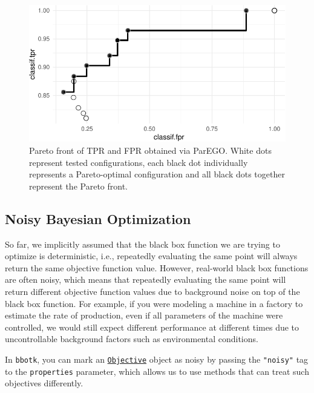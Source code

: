 \begin{figure}

{\centering \includegraphics[width=1\textwidth,height=\textheight]{chapters/chapter5/advanced_tuning_methods_and_black_box_optimization_files/figure-pdf/fig-pareto-bayesopt-1.pdf}

}

\caption{\label{fig-pareto-bayesopt}Pareto front of TPR and FPR obtained
via ParEGO. White dots represent tested configurations, each black dot
individually represents a Pareto-optimal configuration and all black
dots together represent the Pareto front.}

\end{figure}

\hypertarget{sec-noisy-bayesian-optimization}{%
\subsection{Noisy Bayesian
Optimization}\label{sec-noisy-bayesian-optimization}}

So far, we implicitly assumed that the black box function we are trying
to optimize is deterministic, i.e., repeatedly evaluating the same point
will always return the same objective function value. However,
real-world black box functions are often noisy, which means that
repeatedly evaluating the same point will return different objective
function values due to background noise on top of the black box
function. For example, if you were modeling a machine in a factory to
estimate the rate of production, even if all parameters of the machine
were controlled, we would still expect different performance at
different times due to uncontrollable background factors such as
environmental conditions.

In \texttt{bbotk}, you can mark an
\href{https://bbotk.mlr-org.com/reference/Objective.html}{\texttt{Objective}}
object as noisy by passing the \texttt{"noisy"} tag to the
\texttt{properties} parameter, which allows us to use methods that can
treat such objectives differently.

